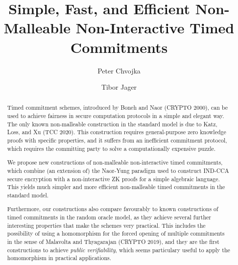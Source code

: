 \documentclass{llncs}
\author{Peter Chvojka\inst{1} \and Tibor Jager\inst{2}}
\institute{Institute of Rocket Science, \url{spam@rocketscience.es} \and University of Wuppertal, \url{jager@uni-wuppertal.de}}
\begin{document}
\title{Simple, Fast, and Efficient Non-Malleable Non-Interactive Timed Commitments}


\maketitle
\begin{abstract}
Timed commitment schemes, introduced by Boneh and Naor (CRYPTO 2000), can be used to achieve fairness in secure computation protocols in a simple and elegant way.
The only known non-malleable construction in the standard model is due to Katz, Loss, and Xu (TCC 2020). This construction requires general-purpose zero knowledge proofs with specific properties, and it suffers from an inefficient commitment protocol, which requires the committing party to solve a computationally expensive puzzle.

We propose new constructions of non-malleable non-interactive timed commitments, which combine (an extension of) the Naor-Yung paradigm used to construct IND-CCA secure encryption with a non-interactive ZK proofs for a simple algebraic language. This yields much simpler and more efficient non-malleable timed commitments in the standard model.

Furthermore, our constructions also compare favourably to known constructions of timed commitments in the random oracle model, as they achieve several further interesting properties that make the schemes very practical. This includes the possibility of using a homomorphism for the forced opening of multiple commitments in the sense of Malavolta and Thyagarajan (CRYPTO 2019), and they are the first constructions to achieve \emph{public verifiability}, which seems particulary useful to apply the homomorphism in practical applications.
\end{abstract}


















\begin{appendix}

%


\end{appendix}
\end{document}
